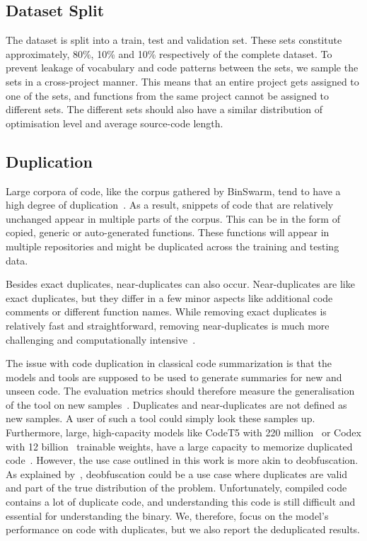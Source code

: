 \subsection{Dataset Split}
The dataset is split into a train, test and validation set. These sets constitute approximately, 80\%, 10\% and 10\% respectively\cite{recommend_summarization} of the complete dataset. To prevent leakage of vocabulary and code patterns between the sets, we sample the sets in a cross-project manner. This means that an entire project gets assigned to one of the sets, and functions from the same project cannot be assigned to different sets. The different sets should also have a similar distribution of optimisation level and average source-code length.

\subsection{Duplication}
Large corpora of code, like the corpus gathered by BinSwarm, tend to have a high degree of duplication~\cite{recommend_summarization}. As a result, snippets of code that are relatively unchanged appear in multiple parts of the corpus. This can be in the form of copied, generic or auto-generated functions. These functions will appear in multiple repositories and might be duplicated across the training and testing data.

Besides exact duplicates, near-duplicates can also occur. Near-duplicates are like exact duplicates, but they differ in a few minor aspects like additional code comments or different function names. While removing exact duplicates is relatively fast and straightforward, removing near-duplicates is much more challenging and computationally intensive~\cite{allamanis_adverse}. 

The issue with code duplication in classical code summarization is that the models and tools are supposed to be used to generate summaries for new and unseen code. The evaluation metrics should therefore measure the generalisation of the tool on new samples~\cite{allamanis_adverse}. Duplicates and near-duplicates are not defined as new samples. A user of such a tool could simply look these samples up. Furthermore, large, high-capacity models like CodeT5 with 220 million~\cite{CodeT5} or Codex with 12 billion~\cite{CodeX} trainable weights, have a large capacity to memorize duplicated code~\cite{allamanis_adverse}.
However, the use case outlined in this work is more akin to deobfuscation. As explained by~\citeauthor{allamanis_adverse}, deobfuscation could be a use case where duplicates are valid and part of the true distribution of the problem\cite{allamanis_adverse}. Unfortunately, compiled code contains a lot of duplicate code, and understanding this code is still difficult and essential for understanding the binary. We, therefore, focus on the model's performance on code with duplicates, but we also report the deduplicated results.

